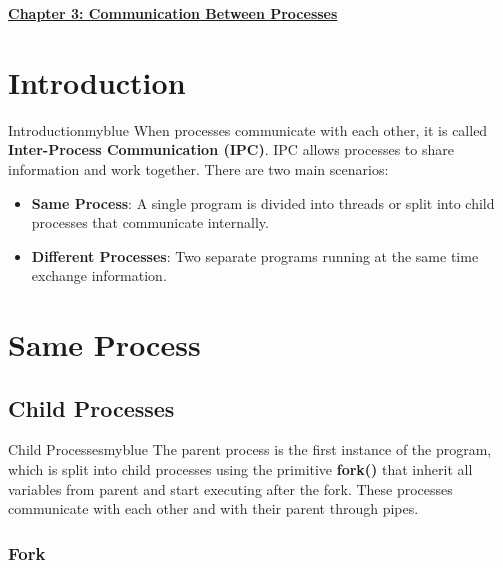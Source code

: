 \newpage
\null
\vspace{0.15cm}

\begin{center}
    \Huge{\textbf{\underline{Chapter 3: Communication Between Processes}}}
\end{center}

\setcounter{section}{0}

\vspace{0.35cm}


\section{Introduction}

\begin{prettyBox}{Introduction}{myblue}
When processes communicate with each other, it is called \textbf{Inter-Process Communication (IPC)}. IPC allows processes to share information and work together. There are two main scenarios: 
\begin{itemize}
    \item \textbf{Same Process}: A single program is divided into threads or split into child processes that communicate internally.
    \item \textbf{Different Processes}: Two separate programs running at the same time exchange information.
\end{itemize}
\end{prettyBox}

\vspace{0.35cm}

\section{Same Process}

\subsection{Child Processes}
\begin{prettyBox}{Child Processes}{myblue}
The parent process is the first instance of the program, which is split into child
processes using the primitive \textbf{fork()} that inherit all variables from parent and start executing after the fork. These processes communicate with
each other and with their parent through pipes.
\end{prettyBox}

\vspace{0.35cm}

\subsubsection{Fork}

